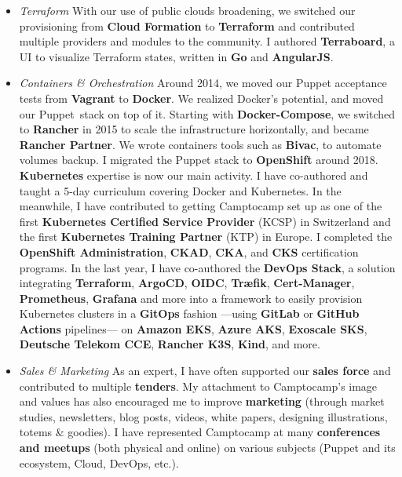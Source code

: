 \documentclass[11pt,a4paper,nolmodern]{moderncv}
\begin{document}
{\begin{itemize}
    \item \emph{Terraform}\newline
      With our use of public clouds broadening, we switched our provisioning from \textbf{Cloud Formation} to \textbf{Terraform} and contributed multiple providers and modules to the community.
      I authored \textbf{Terraboard}, a UI to visualize Terraform states, written in \textbf{Go} and \textbf{AngularJS}.
    \item \emph{Containers \& Orchestration}\newline
      Around 2014, we moved our Puppet acceptance tests from \textbf{Vagrant} to \textbf{Docker}.
      We realized Docker's potential, and moved our Puppet stack on top of it.
      Starting with \textbf{Docker-Compose}, we switched to \textbf{Rancher} in 2015 to scale the infrastructure horizontally, and became \textbf{Rancher Partner}.
      We wrote containers tools such as \textbf{Bivac}, to automate volumes backup.
      I migrated the Puppet stack to \textbf{OpenShift} around 2018. \newline
      \textbf{Kubernetes} expertise is now our main activity. I have co-authored and taught a 5-day curriculum covering Docker and Kubernetes.
      In the meanwhile, I have contributed to getting Camptocamp set up as one of the first \textbf{Kubernetes Certified Service Provider} (KCSP) in Switzerland and the first \textbf{Kubernetes Training Partner} (KTP) in Europe.\newline
      I completed the \textbf{OpenShift Administration}, \textbf{CKAD}, \textbf{CKA}, and \textbf{CKS} certification programs.\newline
      In the last year, I have co-authored the \textbf{DevOps Stack}, a solution integrating \textbf{Terraform}, \textbf{ArgoCD}, \textbf{OIDC},
      \textbf{Træfik}, \textbf{Cert-Manager}, \textbf{Prometheus}, \textbf{Grafana} and more into a framework to easily provision Kubernetes clusters in a \textbf{GitOps} fashion
      —using \textbf{GitLab} or \textbf{GitHub Actions} pipelines—
      on \textbf{Amazon EKS}, \textbf{Azure AKS}, \textbf{Exoscale SKS}, \textbf{Deutsche Telekom CCE}, \textbf{Rancher K3S}, \textbf{Kind}, and more.
    \item \emph{Sales \& Marketing}\newline
      As an expert, I have often
      supported our \textbf{sales force} and contributed to multiple \textbf{tenders}.
      My attachment to Camptocamp's image and values has also encouraged me to improve \textbf{marketing} (through market studies, newsletters, blog posts, videos, white papers, designing illustrations, totems \& goodies).
      I have represented Camptocamp at many \textbf{conferences and meetups} (both physical and online) on various subjects (Puppet and its ecosystem, Cloud, DevOps, etc.).
  \end{itemize}
}
\end{document}
